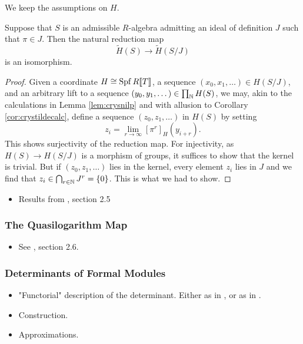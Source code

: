 We keep the assumptions on $H$.
\begin{lem}
  Suppose that $S$ is an admissible $R$-algebra admitting an ideal of definition
  $J$ such that $\pi \in J$. Then the natural reduction map
  \begin{equation*}
    \tilde H(S) \to \tilde H(S/J)
  \end{equation*}
  is an isomorphism.
  \begin{proof}[Proof]
    Given a coordinate $H \cong \operatorname{Spf} R\llbracket T \rrbracket$, a sequence $(x_0, x_1,
    \dots) \in H(S/J)$, and an arbitrary lift to a sequence $(y_0, y_1, \dots)
    \in \prod_{\mathbb{N}} H(S)$, we may, akin to
    the calculations in Lemma \ref{lem:crysnilp} and with allusion to Corollary
    \ref{cor:crystildecalc}, define a sequence $(z_0, z_1, \dots)$ in
    $H(S)$ by setting 
    \begin{equation*}
      z_i = \lim_{r \to \infty} [\pi^r]_{H}(y_{i+r}).
    \end{equation*}
    This shows surjectivity of the reduction map. For injectivity,
    as $H(S) \to H(S/J)$ is a morphism of groups, it suffices to show that the kernel
    is trivial. But if $(z_0, z_1, \dots)$ lies in the kernel, every element 
    $z_i$ lies in $J$ and we find that $z_i \in \bigcap_{r \in \mathbb{N}} J^r = \{0\}$.
    This is what we had to show.
  \end{proof}
\end{lem}

\begin{itemize}
  \item Results from \cite{BoyarchenkoWeinstein2011MaxVar}, section 2.5
\end{itemize}



\subsubsection{The Quasilogarithm Map} %
\label{ssub:The Quasilogarithm map}
\begin{itemize}
  \item See \cite{BoyarchenkoWeinstein2011MaxVar}, section 2.6.
\end{itemize}

\subsubsection{Determinants of Formal Modules} %
\label{ssub:Determinants of Formal Modules}
\begin{itemize}
  \item "Functorial" description of the determinant. Either as in
    \cite{BoyarchenkoWeinstein2011MaxVar}, or as in \cite{weinstein2016semistable}.
  \item Construction.
  \item Approximations.
\end{itemize}

